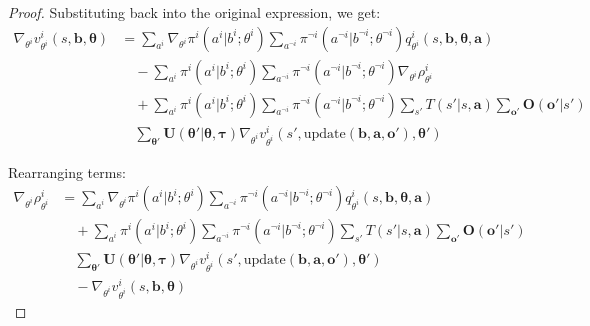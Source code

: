 \documentclass[a4paper,12pt]{report}
\begin{document}
\begin{proof}
    Substituting back into the original expression, we get:
    \begin{align}
        \nabla_{\theta^i}v^{i}_{\theta^i}(s, \boldsymbol{b}, \boldsymbol{\theta}) & = \sum_{a^i}\nabla_{\theta^i}\pi^{i}(a^{i}|b^{i}; \theta^{i}) \sum_{a^{\neg i}}\pi^{\neg i}(a^{\neg i}|b^{\neg i}; \theta^{\neg i}) q^{i}_{\theta^i}(s, \boldsymbol{b}, \boldsymbol{\theta}, \boldsymbol{a})                             \\
                                                                                  & \quad - \sum_{a^i}\pi^{i}(a^{i}|b^{i}; \theta^{i}) \sum_{a^{\neg i}}\pi^{\neg i}(a^{\neg i}|b^{\neg i}; \theta^{\neg i}) \nabla_{\theta^i}\rho^{i}_{\theta^i}                                                                            \\
                                                                                  & \quad + \sum_{a^i}\pi^{i}(a^{i}|b^{i}; \theta^{i}) \sum_{a^{\neg i}}\pi^{\neg i}(a^{\neg i}|b^{\neg i}; \theta^{\neg i}) \sum_{s'}T(s'|s, \boldsymbol{a}) \sum_{\boldsymbol{o}'}\boldsymbol{O}(\boldsymbol{o}'|s')                       \\
                                                                                  & \quad \sum_{\boldsymbol{\theta}'}\boldsymbol{U}(\boldsymbol{\theta}'|\boldsymbol{\theta}, \boldsymbol{\tau}) \nabla_{\theta^i}v^{i}_{\theta^i}(s', \text{update}(\boldsymbol{b}, \boldsymbol{a}, \boldsymbol{o}'), \boldsymbol{\theta}')
    \end{align}

    Rearranging terms:
    \begin{align}
        \nabla_{\theta^i}\rho^{i}_{\theta^i} & = \sum_{a^i}\nabla_{\theta^i}\pi^{i}(a^{i}|b^{i}; \theta^{i}) \sum_{a^{\neg i}}\pi^{\neg i}(a^{\neg i}|b^{\neg i}; \theta^{\neg i}) q^{i}_{\theta^i}(s, \boldsymbol{b}, \boldsymbol{\theta}, \boldsymbol{a})                             \\
                                             & \quad + \sum_{a^i}\pi^{i}(a^{i}|b^{i}; \theta^{i}) \sum_{a^{\neg i}}\pi^{\neg i}(a^{\neg i}|b^{\neg i}; \theta^{\neg i}) \sum_{s'}T(s'|s, \boldsymbol{a}) \sum_{\boldsymbol{o}'}\boldsymbol{O}(\boldsymbol{o}'|s')                       \\
                                             & \quad \sum_{\boldsymbol{\theta}'}\boldsymbol{U}(\boldsymbol{\theta}'|\boldsymbol{\theta}, \boldsymbol{\tau}) \nabla_{\theta^i}v^{i}_{\theta^i}(s', \text{update}(\boldsymbol{b}, \boldsymbol{a}, \boldsymbol{o}'), \boldsymbol{\theta}') \\
                                             & \quad - \nabla_{\theta^i}v^{i}_{\theta^i}(s, \boldsymbol{b}, \boldsymbol{\theta})
    \end{align}


\end{proof}
\end{document}
